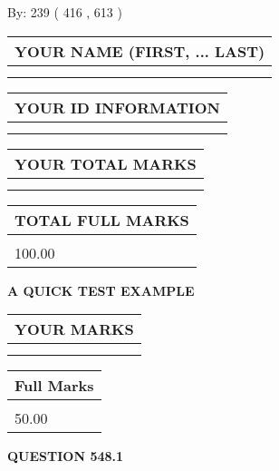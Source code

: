 \documentclass[12pt]{article}
\begin{document}
   
\hspace{1.0in} By: 
 239 ( 416 ,  613 )
   
   
   
   
\newpage 
\setcounter{page}{ 
   548001 } 
   
   
   
   
\noindent\begin{tabular}{|l|}
\hline
YOUR NAME (FIRST, ... LAST)  \\
\hline
 \\ 
 \\ 
\hline
\end{tabular}
\hspace{0.05in} \begin{tabular}{|l|}
\hline
 YOUR   ID   INFORMATION  \\
\hline
 \\ 
 \\ 
\hline
\end{tabular}
   
   
\vspace{0.2in}\noindent\begin{tabular}{|l|}
\hline
YOUR TOTAL MARKS  \\
\hline
 \\ 
 \\ 
\hline
\end{tabular}
\hspace{0.05in} \begin{tabular}{|l|}
\hline
TOTAL FULL MARKS  \\
\hline
 \\ 
100.00 \\
\hline
\end{tabular}
   
   
 \vspace{0.2in}
{\LARGE {\textbf{ A QUICK TEST EXAMPLE}}}
   
   
  
\vspace{0.2in}
  
\noindent\begin{tabular}{|l|}
\hline
 YOUR MARKS  \\
\hline
 \\ 
 \\ 
\hline
\end{tabular}
\hspace{0.05in} \begin{tabular}{|l|}
\hline
 Full Marks  \\
\hline
 \\ 
50.00 \\
\hline
\end{tabular}
{\textbf{\Large{QUESTION
548.1 
}}}
  
\end{document}
